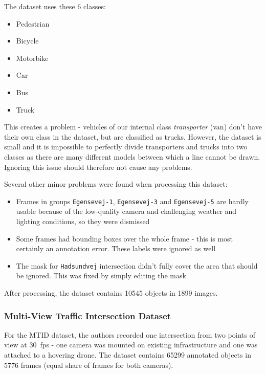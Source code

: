 The dataset uses these 6 classes:
\begin{itemize}
    \item Pedestrian
    \item Bicycle
    \item Motorbike
    \item Car
    \item Bus
    \item Truck
\end{itemize}
This creates a problem - vehicles of our internal class \textit{transporter}
(van) don't have their own class in the dataset, but are classified as trucks.
However, the dataset is small and it is impossible to perfectly divide
transporters and trucks into two classes as there are many different models
between which a line cannot be drawn.  Ignoring this issue should therefore not
cause any problems.

Several other minor problems were found when processing this dataset:
\begin{itemize}
    \item Frames in groups \verb|Egensevej-1|, \verb|Egensevej-3| and
    \verb|Egensevej-5| are hardly usable because of the low-quality camera and
    challenging weather and lighting conditions, so they were dismissed
    \item Some frames had bounding boxes over the whole frame - this is most
    certainly an annotation error. These labels were ignored as well
    \item The mask for \verb|Hadsundvej| intersection didn't fully cover the
    area that should be ignored. This was fixed by simply editing the mask
\end{itemize}

After processing, the dataset contains \num{10545} objects in \num{1899} images.


\subsubsection*{Multi-View Traffic Intersection Dataset}

For the MTID dataset, the authors \cite{Jensen2020} recorded one intersection
from two points of view at \SI{30}{fps} - one camera was mounted on existing
infrastructure and one was attached to a hovering drone. The dataset contains
\num{65299} annotated objects in \num{5776} frames (equal share of frames for
both cameras).


